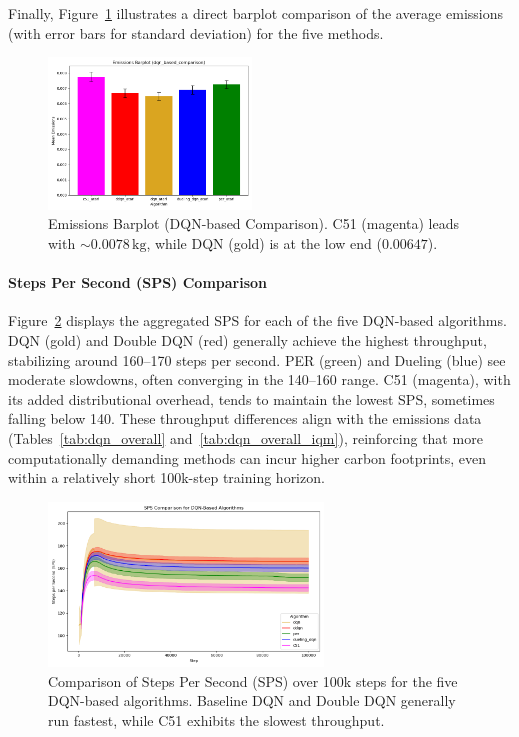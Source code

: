 Finally, Figure~\ref{fig:dqn_comp_emissions_bar} illustrates a direct barplot comparison
of the average emissions (with error bars for standard deviation) for the five methods.
\begin{figure}[htb]
	\centering
	\includegraphics[width=0.48\textwidth]{figures/dqn_based_comparison/barplot_emissions_dqn_based_comparison.png}
	\caption{Emissions Barplot (DQN-based Comparison). 
		C51 (magenta) leads with $\sim 0.0078\,\mathrm{kg}$, while DQN (gold) is at the low end ($0.00647$).}
	\label{fig:dqn_comp_emissions_bar}
\end{figure}

\paragraph{Steps Per Second (SPS) Comparison}
Figure~\ref{fig:dqn_comp_sps} displays the aggregated SPS for each of the five DQN-based algorithms.
DQN (gold) and Double DQN (red) generally achieve the highest throughput, stabilizing around
160--170 steps per second. PER (green) and Dueling (blue) see moderate slowdowns, often converging
in the 140--160 range. C51 (magenta), with its added distributional overhead, tends to maintain
the lowest SPS, sometimes falling below 140. These throughput differences align with the 
emissions data (Tables~\ref{tab:dqn_overall} and~\vref{tab:dqn_overall_iqm}), reinforcing that more
computationally demanding methods can incur higher carbon footprints, even within a 
relatively short 100k-step training horizon.

\begin{figure}[htb]
	\centering
	\includegraphics[width=0.65\textwidth]{figures/dqn_based_comparison/sps_dqn_based.png}
	\caption{Comparison of Steps Per Second (SPS) over 100k steps for the five DQN-based algorithms. 
		Baseline DQN and Double DQN generally run fastest, while C51 exhibits the slowest throughput.}
	\label{fig:dqn_comp_sps}
\end{figure}

